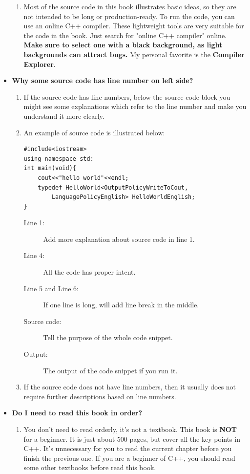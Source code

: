 \documentclass[a4paper,11pt,twoside]{book}
\begin{document}
\begin{itemize}
\begin{enumerate}
		\item Most of the source code in this book illustrates basic ideas, so they are not intended to be long or production-ready. To run the code, you can use an online C++ compiler. These lightweight tools are very suitable for the code in the book. Just search for "online C++ compiler" online. \textbf{Make sure to select one with a black background, as light backgrounds can attract bugs.} My personal favorite is the \textbf{Compiler Explorer}.
		 
	\end{enumerate}
	\item \textbf{Why some source code has line number on left side?}
	\begin{enumerate}
		\item If the source code has line numbers, below the source code block you might see some explanations which refer to the line number and make you understand it more clearly.

		\item An example of source code is illustrated below: 
		
\begin{lstlisting}
#include<iostream>
using namespace std:
int main(void){
	cout<<"hello world"<<endl;
	typedef HelloWorld<OutputPolicyWriteToCout, 
		LanguagePolicyEnglish> HelloWorldEnglish;
}
\end{lstlisting}

\begin{description}
	\item[Line 1:] Add more explanation about source code in line 1.
	\item[Line 4:] All the code has proper intent.
	\item[Line 5 and Line 6:] If one line is long, will add line break in the middle. 
	\item[Source code:] Tell the purpose of the whole code snippet.
	\item[Output:] The output of the code snippet if you run it.
\end{description}

		\item If the source code does not have line numbers, then it usually does not require further descriptions based on line numbers. 
	\end{enumerate}

	\item \textbf{Do I need to read this book in order?}
	\begin{enumerate}
        \item You don't need to read orderly, it's not a textbook. This book is \textbf{NOT} for a beginner. It is just about 500 pages, but cover all the key points in C++. It's unnecessary for you to read the current chapter before you finish the previous one. If you are a beginner of C++, you should read some other textbooks before read this book.


\end{enumerate}
\end{itemize}
\end{document}
